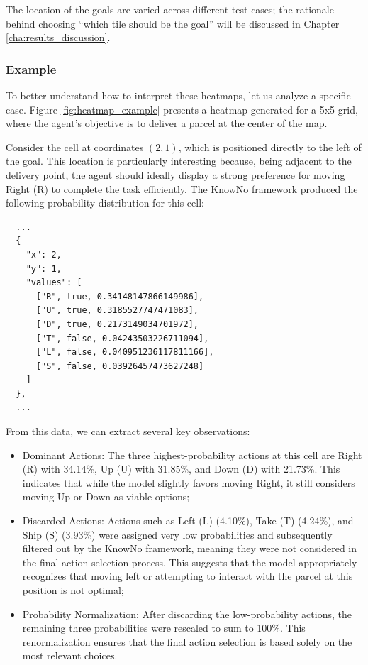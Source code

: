The location of the goals are varied across different test cases; the rationale
behind choosing ``which tile should be the goal'' will be discussed in Chapter
\ref{cha:results_discussion}.

\subsubsection{Example}

To better understand how to interpret these heatmaps, let us analyze a specific
case. Figure \ref{fig:heatmap_example} presents a heatmap generated for a 5x5 grid,
where the agent's objective is to deliver a parcel at the center of the map.

Consider the cell at coordinates $(2,1)$, which is positioned directly to the left
of the goal. This location is particularly interesting because, being adjacent to
the delivery point, the agent should ideally display a strong preference for
moving Right (R) to complete the task efficiently. The KnowNo framework produced
the following probability distribution for this cell:

\begin{verbatim}
  ...
  {
    "x": 2,
    "y": 1,
    "values": [
      ["R", true, 0.34148147866149986],
      ["U", true, 0.3185527747471083],
      ["D", true, 0.2173149034701972],
      ["T", false, 0.04243503226711094],
      ["L", false, 0.040951236117811166],
      ["S", false, 0.03926457473627248]
    ]
  },
  ...
\end{verbatim}

From this data, we can extract several key observations:
\begin{itemize}
  \item Dominant Actions: The three highest-probability actions at this cell are
    Right (R) with 34.14\%, Up (U) with 31.85\%, and Down (D) with 21.73\%. This
    indicates that while the model slightly favors moving Right, it still considers
    moving Up or Down as viable options;

  \item Discarded Actions: Actions such as Left (L) (4.10\%), Take (T) (4.24\%),
    and Ship (S) (3.93\%) were assigned very low probabilities and subsequently filtered
    out by the KnowNo framework, meaning they were not considered in the final
    action selection process. This suggests that the model appropriately recognizes
    that moving left or attempting to interact with the parcel at this position is
    not optimal;

  \item Probability Normalization: After discarding the low-probability actions,
    the remaining three probabilities were rescaled to sum to 100\%. This renormalization
    ensures that the final action selection is based solely on the most relevant
    choices.
\end{itemize}

